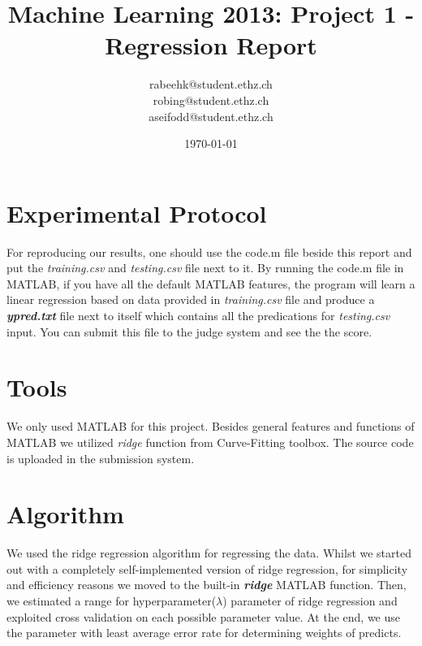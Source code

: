 \documentclass[a4paper, 11pt]{article}
\title{Machine Learning 2013: Project 1 - Regression Report}
\author{rabeehk@student.ethz.ch\\ robing@student.ethz.ch\\ aseifodd@student.ethz.ch\\ }
\date{\today}
\begin{document}
\maketitle

\section*{Experimental Protocol}
For reproducing our results, one should use the code.m file beside this report and put the \textit{training.csv} and \textit{testing.csv} file next to it. By running the code.m file in MATLAB, if you have all the default MATLAB features, the program will learn a linear regression based on data provided in \textit{training.csv} file and produce a \textbf{\textit{ypred.txt}} file next to itself which contains all the predications for \textit{testing.csv} input. You can submit this file to the judge system and see the the score.

\section{Tools}
We only used MATLAB for this project. Besides general features and functions of MATLAB we utilized \textit{ridge} function from Curve-Fitting toolbox. The source code is uploaded in the submission system. 

\section{Algorithm}
We used the ridge regression algorithm for regressing the data. Whilst we started out with a completely self-implemented version of ridge regression, for simplicity and efficiency reasons we moved to the built-in \textbf{\textit{ridge}} MATLAB function. Then, we estimated a range for hyperparameter($\lambda$) parameter of ridge regression and exploited cross validation on each possible parameter value. At the end, we use the parameter with least average error rate for determining weights of predicts.
\end{document}
